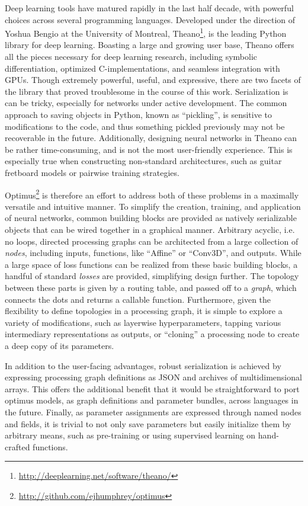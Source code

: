 Deep learning tools have matured rapidly in the last half decade, with powerful choices across several programming languages.
Developed under the direction of Yoshua Bengio at the University of Montreal, Theano\footnote{\url{http://deeplearning.net/software/theano/}}, is the leading Python library for deep learning.
Boasting a large and growing user base, Theano offers all the pieces necessary for deep learning research, including symbolic differentiation, optimized C-implementations, and seamless integration with GPUs.
Though extremely powerful, useful, and expressive, there are two facets of the library that proved troublesome in the course of this work.
Serialization is can be tricky, especially for networks under active development.
The common approach to saving objects in Python, known as ``pickling'', is sensitive to modifications to the code, and thus something pickled previously may not be recoverable in the future.
Additionally, designing neural networks in Theano can be rather time-consuming, and is not the most user-friendly experience.
This is especially true when constructing non-standard architectures, such as guitar fretboard models or pairwise training strategies.

Optimus\footnote{\url{http://github.com/ejhumphrey/optimus}} is therefore an effort to address both of these problems in a maximally versatile and intuitive manner.
To simplify the creation, training, and application of neural networks, common building blocks are provided as natively serializable objects that can be wired together in a graphical manner.
Arbitrary acyclic, i.e. no loops, directed processing graphs can be architected from a large collection of \emph{nodes}, including inputs, functions, like ``Affine'' or ``Conv3D'', and outputs.
While a large space of loss functions can be realized from these basic building blocks, a handful of standard \emph{losses} are provided, simplifying design further.
The topology between these parts is given by a routing table, and passed off to a \emph{graph}, which connects the dots and returns a callable function.
Furthermore, given the flexibility to define topologies in a processing graph, it is simple to explore a variety of modifications, such as layerwise hyperparameters, tapping various intermediary representations as outputs, or ``cloning'' a processing node to create a deep copy of its parameters.

In addition to the user-facing advantages, robust serialization is achieved by expressing processing graph definitions as JSON and archives of multidimensional arrays.
This offers the additional benefit that it would be straightforward to port optimus models, as graph definitions and parameter bundles, across languages in the future.
Finally, as parameter assignments are expressed through named nodes and fields, it is trivial to not only save parameters but easily initialize them by arbitrary means, such as pre-training or using supervised learning on hand-crafted functions.


